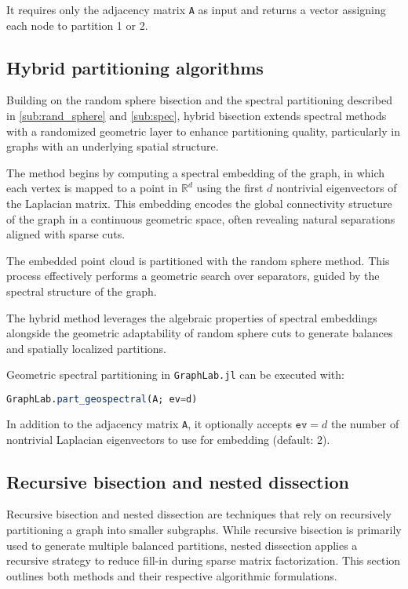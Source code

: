 \documentclass[../paper.tex]{subfiles}
\begin{document}
    It requires only the adjacency matrix \texttt{A} as input and returns a vector assigning each node to partition 1 or 2.


    \subsection{Hybrid partitioning algorithms}
    \label{subsec:hybrid}
    Building on the random sphere bisection and the spectral partitioning described in \ref{sub:rand_sphere} and \ref{sub:spec}, hybrid bisection extends spectral methods with
    a randomized geometric layer to enhance partitioning quality, particularly in graphs with an underlying spatial structure.

    The method begins by computing a spectral embedding of the graph, in which each vertex is mapped to a point in $\mathbb{R}^d$ using the first $d$ nontrivial eigenvectors of the Laplacian matrix. This embedding encodes the global
    connectivity structure of the graph in a continuous geometric space, often revealing natural separations aligned
    with sparse cuts.

    The embedded point cloud is partitioned with the random sphere method. This process effectively performs a geometric search over separators, guided by the spectral structure of the graph.

    The hybrid method leverages the algebraic properties of spectral embeddings alongside the geometric adaptability of random sphere cuts to generate balances and spatially localized partitions.

    Geometric spectral partitioning in \texttt{GraphLab.jl} can be executed with:

    \begin{lstlisting}[language=Julia]
    GraphLab.part_geospectral(A; ev=d)
    \end{lstlisting}

    In addition to the adjacency matrix \texttt{A}, it optionally accepts $\texttt{ev}=d$ the number of nontrivial Laplacian eigenvectors to use for embedding (default: 2).
    
    \subsection{Recursive bisection and nested dissection}
    Recursive bisection and nested dissection are techniques that rely on recursively partitioning a graph into smaller subgraphs. While recursive bisection is primarily used to generate multiple balanced partitions, nested dissection applies a recursive strategy to reduce fill-in during sparse matrix factorization. This section outlines both methods and their respective algorithmic formulations.
\end{document}
